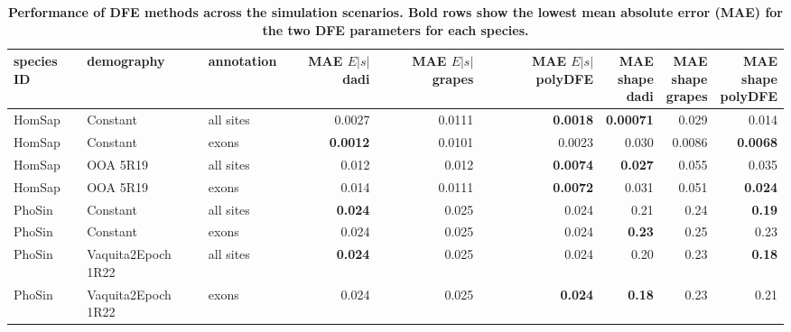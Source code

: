 \documentclass[hidelinks]{article}
\begin{document}
\begin{table}[ht]
\centering
\small
\caption{\bf{Performance of DFE methods across the simulation scenarios}. 
Bold rows show the lowest mean absolute error (MAE) for the two DFE parameters
for each species.}
\begin{tabular}{lllrrrrrr}
\toprule
species ID & demography & annotation & \makecell{MAE \\ $E|s|$ \\ dadi} & \makecell{MAE \\ $E|s|$ \\ grapes} & \makecell{MAE \\ $E|s|$ \\ polyDFE} & \makecell{MAE \\ shape \\ dadi} & \makecell{MAE \\ shape \\ grapes} & \makecell{MAE \\ shape \\ polyDFE} \\
\midrule
HomSap & Constant & all sites & 0.0027 & 0.0111 & \bf{0.0018} & \bf{0.00071} & 0.029 & 0.014 \\
HomSap & Constant & exons & \bf{0.0012} & 0.0101 & 0.0023 & 0.030 & 0.0086 & \bf{0.0068} \\
HomSap & OOA 5R19 & all sites & 0.012 & 0.012 & \bf{0.0074} & \bf{0.027} & 0.055 & 0.035 \\
HomSap & OOA 5R19 & exons & 0.014 & 0.0111 & \bf{0.0072} & 0.031 & 0.051 & \bf{0.024} \\
PhoSin & Constant & all sites & \bf{0.024} & 0.025 & 0.024 & 0.21 & 0.24 & \bf{0.19} \\
PhoSin & Constant & exons & 0.024 & 0.025 & 0.024 & \bf{0.23} & 0.25 & 0.23 \\
PhoSin & Vaquita2Epoch 1R22 & all sites & \bf{0.024} & 0.025 & 0.024 & 0.20 & 0.23 & \bf{0.18} \\
PhoSin & Vaquita2Epoch 1R22 & exons & 0.024 & 0.025 & \bf{0.024} & \bf{0.18} & 0.23 & 0.21 \\
\bottomrule
\end{tabular}
\label{tab:dfe_table}
\end{table}
\end{document}
